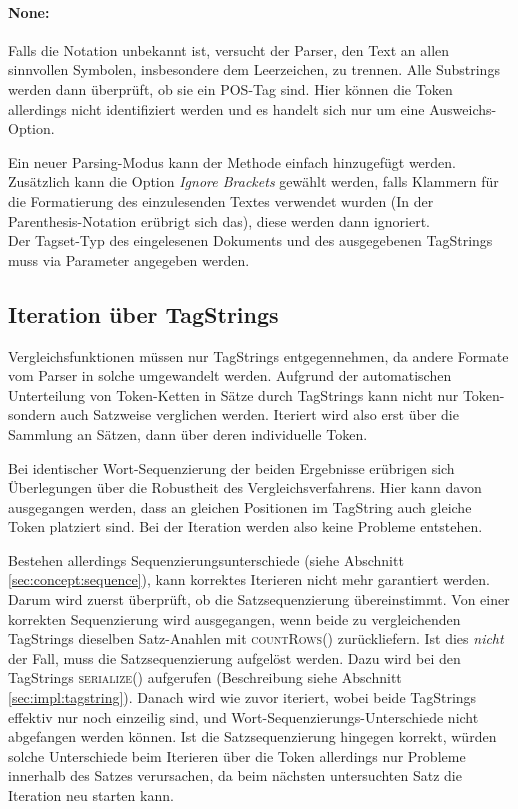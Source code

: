 \paragraph{None:} Falls die Notation unbekannt ist, versucht der Parser, den Text an allen sinnvollen Symbolen, insbesondere dem Leerzeichen, zu trennen. Alle Substrings werden dann überprüft, ob sie ein POS-Tag sind. Hier können die Token allerdings nicht identifiziert werden und es handelt sich nur um eine Ausweichs-Option. 

Ein neuer Parsing-Modus kann der Methode einfach hinzugefügt werden. Zusätzlich kann die Option \textit{\glqq Ignore Brackets\grqq{}} gewählt werden, falls Klammern für die Formatierung des einzulesenden Textes verwendet wurden (In der Parenthesis-Notation erübrigt sich das), diese werden dann ignoriert.
\\
Der Tagset-Typ des eingelesenen Dokuments und des ausgegebenen TagStrings muss via Parameter angegeben werden.

\subsection{Iteration über TagStrings}
\label{sec:impl:eval:comparison}

Vergleichsfunktionen müssen nur TagStrings entgegennehmen, da andere Formate vom Parser in solche umgewandelt werden. Aufgrund der automatischen Unterteilung von Token-Ketten in Sätze durch TagStrings kann nicht nur Token- sondern auch Satzweise verglichen werden. Iteriert wird also erst über die Sammlung an Sätzen, dann über deren individuelle Token.

Bei identischer Wort-Sequenzierung der beiden Ergebnisse erübrigen sich Überlegungen über die Robustheit des Vergleichsverfahrens. Hier kann davon ausgegangen werden, dass an gleichen Positionen im TagString auch gleiche Token platziert sind. Bei der Iteration werden also keine Probleme entstehen.

Bestehen allerdings Sequenzierungsunterschiede (siehe Abschnitt \ref{sec:concept:sequence}), kann korrektes Iterieren nicht mehr garantiert werden. Darum wird zuerst überprüft, ob die Satzsequenzierung übereinstimmt. Von einer korrekten Sequenzierung wird ausgegangen, wenn beide zu vergleichenden TagStrings dieselben Satz-Anahlen mit \textsc{countRows()} zurückliefern. Ist dies \textit{nicht} der Fall, muss die Satzsequenzierung aufgelöst werden. Dazu wird bei den TagStrings \textsc{serialize()} aufgerufen (Beschreibung siehe Abschnitt \ref{sec:impl:tagstring}). Danach wird wie zuvor iteriert, wobei beide TagStrings effektiv nur noch einzeilig sind, und Wort-Sequenzierungs-Unterschiede nicht abgefangen werden können. Ist die Satzsequenzierung hingegen korrekt, würden solche Unterschiede beim Iterieren über die Token allerdings nur Probleme innerhalb des Satzes verursachen, da beim nächsten untersuchten Satz die Iteration neu starten kann.

